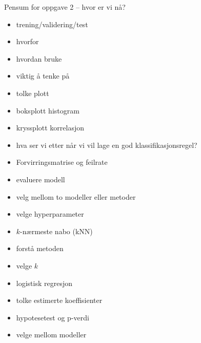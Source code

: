 \documentclass[10pt,ignorenonframetext,]{beamer}
\begin{document}
\begin{frame}

\begin{block}{Pensum for oppgave 2 -- hvor er vi nå?}

\begin{multicols}{2}
\begin{itemize}
\item trening/validering/test
\item hvorfor
\item hvordan bruke
\item viktig å tenke på
\end{itemize}

\vspace{4mm}

\begin{itemize}
\item tolke plott
\item boksplott histogram
\item kryssplott korrelasjon
\item hva ser vi etter når vi vil lage en god klassifikasjonsregel?
\end{itemize}

\vspace{15mm}

\begin{itemize}
\item Forvirringsmatrise og feilrate
\item evaluere modell
\item velg mellom to modeller eller metoder
\item velge hyperparameter
\end{itemize}

\vspace{4mm}

\begin{itemize}
\item $k$-nærmeste nabo (kNN)
\item forstå metoden
\item velge $k$
\end{itemize}

\vspace{4mm}

\begin{itemize}
\item logistisk regresjon
\item tolke estimerte koeffisienter
\item hypotesetest og p-verdi
\item velge mellom modeller
\end{itemize}
\end{multicols}

\end{block}

\end{frame}
\end{document}
